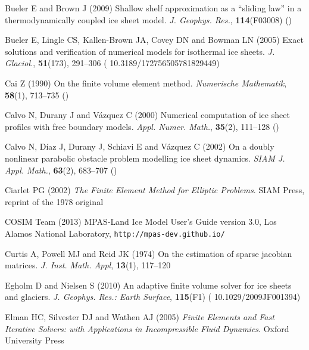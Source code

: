 \documentclass[twocolumn,letterpaper]{igs}
\begin{document}
\begin{thebibliography}{42}
Bueler E and Brown J (2009) Shallow shelf approximation as a ``sliding law'' in
  a thermodynamically coupled ice sheet model. \emph{J. Geophys. Res.},
  \textbf{114}({F}03008) ()

Bueler E, Lingle CS, Kallen-Brown JA, Covey DN and Bowman LN (2005) Exact
  solutions and verification of numerical models for isothermal ice sheets.
  \emph{J. Glaciol.}, \textbf{51}(173), 291--306 (\doi
  {10.3189/172756505781829449})

Cai Z (1990) On the finite volume element method. \emph{Numerische Mathematik},
  \textbf{58}(1), 713--735 ()

Calvo N, Durany J and V\'azquez C (2000) Numerical computation of ice sheet
  profiles with free boundary models. \emph{Appl. Numer. Math.},
  \textbf{35}(2), 111--128 ()

Calvo N, D\'iaz J, Durany J, Schiavi E and V\'azquez C (2002) On a doubly
  nonlinear parabolic obstacle problem modelling ice sheet dynamics. \emph{SIAM
  J. Appl. Math.}, \textbf{63}(2), 683--707 ()

Ciarlet PG (2002) \emph{The {F}inite {E}lement {M}ethod for {E}lliptic
  {P}roblems}. SIAM Press, reprint of the 1978 original

{COSIM Team} (2013) {MPAS-Land Ice Model User’s Guide} version 3.0, {L}os
  Alamos National Laboratory, \texttt{http://mpas-dev.github.io/}

Curtis A, Powell MJ and Reid JK (1974) On the estimation of sparse jacobian
  matrices. \emph{J. Inst. Math. Appl}, \textbf{13}(1), 117--120

Egholm D and Nielsen S (2010) An adaptive finite volume solver for ice sheets
  and glaciers. \emph{J. Geophys. Res.: Earth Surface}, \textbf{115}(F1) (\doi
  {10.1029/2009JF001394})

Elman HC, Silvester DJ and Wathen AJ (2005) \emph{Finite {E}lements and {F}ast
  {I}terative {S}olvers: with {A}pplications in {I}ncompressible {F}luid
  {D}ynamics}. Oxford University Press


\end{thebibliography}
\end{document}
